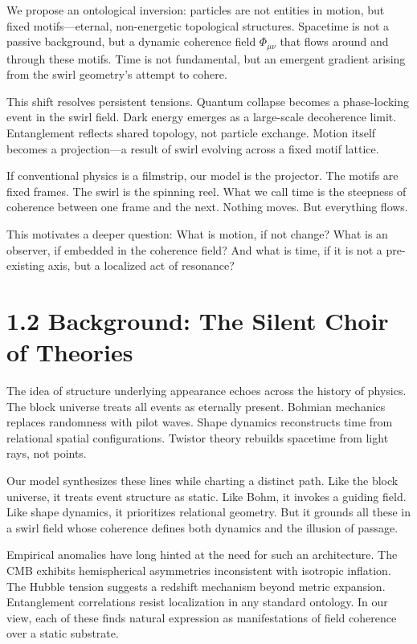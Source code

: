 \documentclass[
  11pt,
]{article}
\begin{document}
We propose an ontological inversion: particles are not entities in
motion, but fixed motifs---eternal, non-energetic topological
structures. Spacetime is not a passive background, but a dynamic
coherence field \(\Phi_{\mu\nu}\) that flows around and through these
motifs. Time is not fundamental, but an emergent gradient arising from
the swirl geometry's attempt to cohere.

This shift resolves persistent tensions. Quantum collapse becomes a
phase-locking event in the swirl field. Dark energy emerges as a
large-scale decoherence limit. Entanglement reflects shared topology,
not particle exchange. Motion itself becomes a projection---a result of
swirl evolving across a fixed motif lattice.

If conventional physics is a filmstrip, our model is the projector. The
motifs are fixed frames. The swirl is the spinning reel. What we call
time is the steepness of coherence between one frame and the next.
Nothing moves. But everything flows.

This motivates a deeper question: What is motion, if not change? What is
an observer, if embedded in the coherence field? And what is time, if it
is not a pre-existing axis, but a localized act of resonance?

\section{1.2 Background: The Silent Choir of
Theories}\label{background-the-silent-choir-of-theories}

The idea of structure underlying appearance echoes across the history of
physics. The block universe treats all events as eternally present.
Bohmian mechanics replaces randomness with pilot waves. Shape dynamics
reconstructs time from relational spatial configurations. Twistor theory
rebuilds spacetime from light rays, not points.

Our model synthesizes these lines while charting a distinct path. Like
the block universe, it treats event structure as static. Like Bohm, it
invokes a guiding field. Like shape dynamics, it prioritizes relational
geometry. But it grounds all these in a swirl field whose coherence
defines both dynamics and the illusion of passage.

Empirical anomalies have long hinted at the need for such an
architecture. The CMB exhibits hemispherical asymmetries inconsistent
with isotropic inflation. The Hubble tension suggests a redshift
mechanism beyond metric expansion. Entanglement correlations resist
localization in any standard ontology. In our view, each of these finds
natural expression as manifestations of field coherence over a static
substrate.
\end{document}
